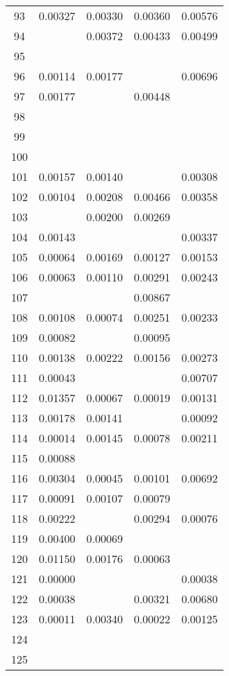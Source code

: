 \documentclass{elsarticle}
\begin{document}
\begin{center}
\begin{longtable}{|c|cccc|}
  93 & 0.00327 & 0.00330 & 0.00360 & 0.00576 \\
  94 &  & 0.00372 & 0.00433 & 0.00499 \\
  95 &  &  &  &  \\
  96 & 0.00114 & 0.00177 &  & 0.00696 \\
  97 & 0.00177 &  & 0.00448 &  \\
  98 &  &  &  &  \\
  99 &  &  &  &  \\
  100 &  &  &  &  \\
  101 & 0.00157 & 0.00140 &  & 0.00308 \\
  102 & 0.00104 & 0.00208 & 0.00466 & 0.00358 \\
  103 &  & 0.00200 & 0.00269 &  \\
  104 & 0.00143 &  &  & 0.00337 \\
  105 & 0.00064 & 0.00169 & 0.00127 & 0.00153 \\
  106 & 0.00063 & 0.00110 & 0.00291 & 0.00243 \\
  107 &  &  & 0.00867 &  \\
  108 & 0.00108 & 0.00074 & 0.00251 & 0.00233 \\
  109 & 0.00082 &  & 0.00095 &  \\
  110 & 0.00138 & 0.00222 & 0.00156 & 0.00273 \\
  111 & 0.00043 &  &  & 0.00707 \\
  112 & 0.01357 & 0.00067 & 0.00019 & 0.00131 \\
  113 & 0.00178 & 0.00141 &  & 0.00092 \\
  114 & 0.00014 & 0.00145 & 0.00078 & 0.00211 \\
  115 & 0.00088 &  &  &  \\
  116 & 0.00304 & 0.00045 & 0.00101 & 0.00692 \\
  117 & 0.00091 & 0.00107 & 0.00079 &  \\
  118 & 0.00222 &  & 0.00294 & 0.00076 \\
  119 & 0.00400 & 0.00069 &  &  \\
  120 & 0.01150 & 0.00176 & 0.00063 &  \\
  121 & 0.00000 &  &  & 0.00038 \\
  122 & 0.00038 &  & 0.00321 & 0.00680 \\
  123 & 0.00011 & 0.00340 & 0.00022 & 0.00125 \\
  124 &  &  &  &  \\
  125 &  &  &  &
\label{fig:z}
\end{longtable}
\end{center}
\end{document}
